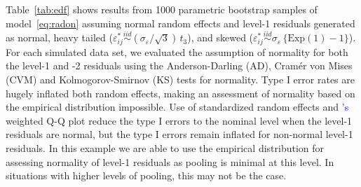 \documentclass{article} %
\newcommand{\citetapos}[1]{\citeauthor{#1}{\textcolor{blue}{'s}} }
\begin{document}
Table~\ref{tab:edf} shows results from 1000 parametric bootstrap samples of model~\eqref{eq:radon} assuming normal random effects and level-1 residuals generated as normal, heavy tailed ($\varepsilon_{ij}^* \overset{iid}{\sim} (\sigma_{\varepsilon} / \sqrt{3})\, t_3$), and skewed ($\varepsilon_{ij}^* \overset{iid}{\sim} \sigma_{\varepsilon} \, \{ \text{Exp}(1) - 1 \}$).
For each simulated data set, we evaluated the assumption of normality for both the level-1 and -2 residuals using the Anderson-Darling (AD), Cram{\'e}r von Mises (CVM) and  Kolmogorov-Smirnov (KS) tests for normality.  
Type I error rates are hugely inflated both random effects, making an assessment of normality based on the empirical distribution impossible. Use of standardized random effects and \citetapos{Lange:1989uu} weighted Q-Q plot reduce the type I errors to the nominal level when the level-1 residuals are normal, but the type I errors remain inflated for non-normal level-1 residuals.
In this example we are able to use the empirical distribution for assessing normality of  level-1 residuals  as  pooling is minimal at this level. In situations with higher levels of pooling, this may not be the case.

\begin{table}[!h]
\centering
\caption{\label{tab:edf} Proportions of tests rejecting the null hypothesis of normality of the predicted random intercept and slope at the nominal .05 significance level when the error terms are normal, heavy tailed, and skewed. The type I error rates are hugely inflated under each setting. \vspace{.5em}}
\qquad
{}
\end{table}
\end{document}
